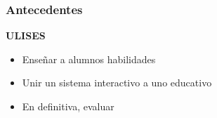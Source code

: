 \begin{frame}
	\frametitle{Antecedentes}
	\textbf{ULISES}
	
	\begin{itemize}
		\item Ense\~nar a alumnos habilidades
		\item Unir un sistema interactivo a uno educativo
		\item En definitiva, evaluar
	\end{itemize}
\end{frame}